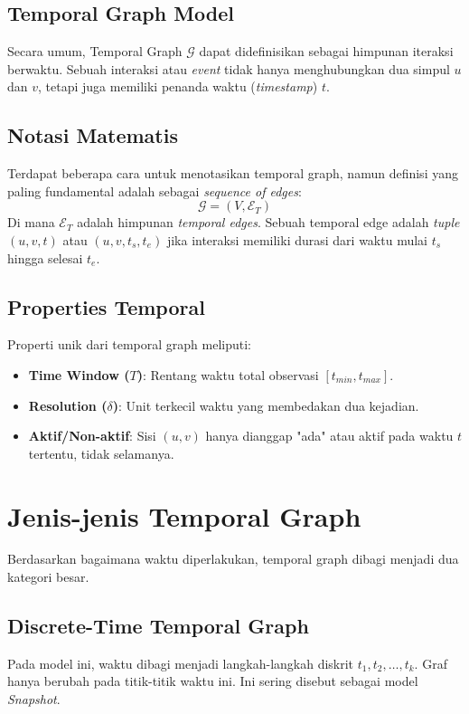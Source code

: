 \documentclass[12pt,a4paper]{book}
\begin{document}
\subsection{Temporal Graph Model}
Secara umum, Temporal Graph $\mathcal{G}$ dapat didefinisikan sebagai himpunan iteraksi berwaktu. Sebuah interaksi atau \textit{event} tidak hanya menghubungkan dua simpul $u$ dan $v$, tetapi juga memiliki penanda waktu (\textit{timestamp}) $t$.

\subsection{Notasi Matematis}
Terdapat beberapa cara untuk menotasikan temporal graph, namun definisi yang paling fundamental adalah sebagai \textit{sequence of edges}:
$$ \mathcal{G} = (V, \mathcal{E}_{T}) $$
Di mana $\mathcal{E}_{T}$ adalah himpunan \textit{temporal edges}. Sebuah temporal edge adalah \textit{tuple} $(u, v, t)$ atau $(u, v, t_s, t_e)$ jika interaksi memiliki durasi dari waktu mulai $t_s$ hingga selesai $t_e$.

\subsection{Properties Temporal}
Properti unik dari temporal graph meliputi:
\begin{itemize}
    \item \textbf{Time Window ($T$)}: Rentang waktu total observasi $[t_{min}, t_{max}]$.
    \item \textbf{Resolution ($\delta$)}: Unit terkecil waktu yang membedakan dua kejadian.
    \item \textbf{Aktif/Non-aktif}: Sisi $(u,v)$ hanya dianggap "ada" atau aktif pada waktu $t$ tertentu, tidak selamanya.
\end{itemize}

\section{Jenis-jenis Temporal Graph}
Berdasarkan bagaimana waktu diperlakukan, temporal graph dibagi menjadi dua kategori besar.

\subsection{Discrete-Time Temporal Graph}
Pada model ini, waktu dibagi menjadi langkah-langkah diskrit $t_1, t_2, \dots, t_k$. Graf hanya berubah pada titik-titik waktu ini. Ini sering disebut sebagai model \textit{Snapshot}.
\end{document}
